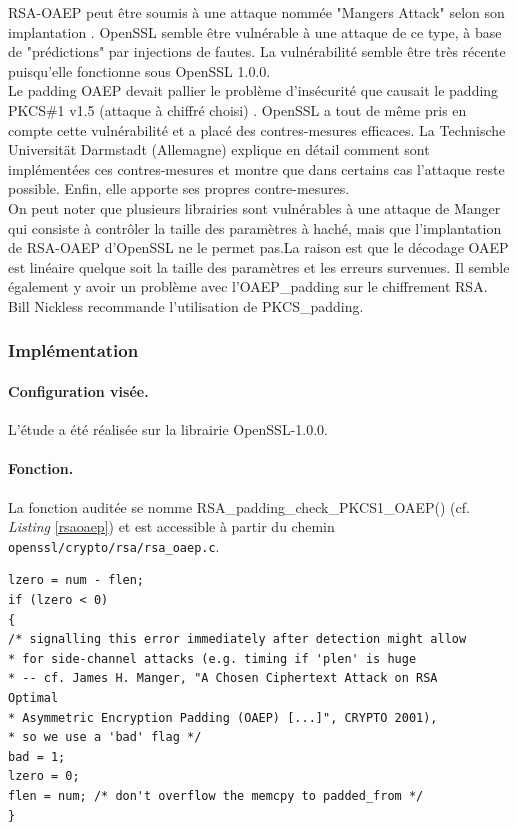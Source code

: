 RSA-OAEP peut être soumis à une attaque nommée "Mangers Attack" selon son implantation \cite{mangers2010falko}. OpenSSL semble être vulnérable à une attaque de ce type, à base de "prédictions" par injections de fautes. La vulnérabilité semble être très récente puisqu'elle fonctionne sous OpenSSL 1.0.0.\\


Le padding OAEP devait pallier le problème d'insécurité que causait le padding PKCS\#1 v1.5 (attaque à chiffré choisi) \cite{bleichenbacherPCKS}. OpenSSL a tout de même pris en compte cette vulnérabilité et a placé des contres-mesures efficaces. La Technische Universität Darmstadt (Allemagne) explique en détail comment sont implémentées ces contres-mesures et montre que dans certains cas l'attaque reste possible. Enfin, elle apporte ses propres contre-mesures.\\

On peut noter que plusieurs librairies sont vulnérables à une attaque de Manger qui consiste à contrôler la taille des paramètres à haché, mais que l'implantation de RSA-OAEP d'OpenSSL ne le permet pas.La raison est que le décodage OAEP est linéaire quelque soit la taille des paramètres et les erreurs survenues. Il semble également y avoir un problème avec l'OAEP\_padding sur le chiffrement RSA. Bill Nickless recommande l'utilisation de PKCS\_padding. \cite{sourceforgeRSAbroken}	\\


\subsubsection{Implémentation}

\paragraph{Configuration visée.\\}

L'étude a été réalisée sur la librairie OpenSSL-1.0.0.

\paragraph{Fonction.\\}

La fonction auditée se nomme RSA\_padding\_check\_PKCS1\_OAEP() (cf. \textit{Listing} \ref{rsaoaep}) et est accessible à partir du chemin \texttt{openssl/crypto/rsa/rsa\_oaep.c}.


\begin{lstlisting}[style=customc,caption=rsa\_oaep.c,
label=rsaoaep]
lzero = num - flen;
if (lzero < 0)
{
/* signalling this error immediately after detection might allow
* for side-channel attacks (e.g. timing if 'plen' is huge
* -- cf. James H. Manger, "A Chosen Ciphertext Attack on RSA
Optimal
* Asymmetric Encryption Padding (OAEP) [...]", CRYPTO 2001),
* so we use a 'bad' flag */
bad = 1;
lzero = 0;
flen = num; /* don't overflow the memcpy to padded_from */
}
\end{lstlisting}

